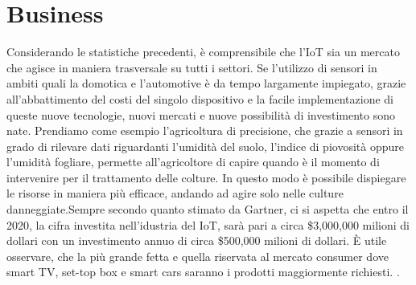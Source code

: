 \section{Business}
Considerando le statistiche precedenti, è comprensibile che l'IoT sia un
mercato che agisce in maniera trasversale su tutti i settori.  Se l'utilizzo di
sensori in ambiti quali la domotica e l'automotive è da tempo largamente
impiegato, grazie all'abbattimento del costi del
singolo  dispositivo e la facile implementazione di queste nuove tecnologie,  nuovi
mercati e nuove possibilità di investimento sono nate. Prendiamo come esempio
l'agricoltura di precisione, che grazie a sensori in grado di rilevare dati
riguardanti l'umidità del suolo, l'indice di piovosità oppure l'umidità fogliare,
permette all'agricoltore di  capire quando è il momento di intervenire per il
trattamento delle colture. In questo modo è possibile dispiegare le risorse in
maniera più efficace, andando ad agire solo nelle culture danneggiate.Sempre
secondo quanto stimato da Gartner, ci si aspetta che entro il 2020, 
la cifra investita nell'idustria del IoT,
sarà pari a circa \$3,000,000 milioni di dollari con un investimento annuo di
circa \$500,000 milioni di dollari. È utile osservare, che la più grande fetta e quella
riservata al mercato consumer dove smart TV, set-top box e smart cars saranno i prodotti
maggiormente richiesti.
\cite{gartner2016}. 



